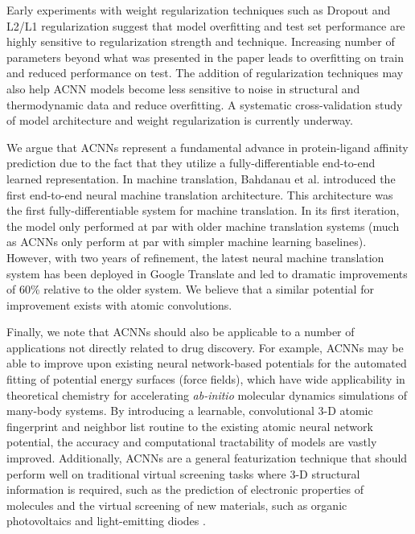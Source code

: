 Early experiments with weight regularization techniques such as Dropout and L2/L1 regularization suggest that model overfitting and test set performance are highly sensitive to regularization strength and technique.  Increasing number of parameters beyond what was presented in the paper leads to overfitting on train and reduced performance on test.  The addition of regularization techniques may also help ACNN models become less sensitive to noise in structural and thermodynamic data and reduce overfitting.  A systematic cross-validation study of model architecture and weight regularization is currently underway.

We argue that ACNNs represent a fundamental advance in protein-ligand affinity prediction due to the fact that they utilize a fully-differentiable end-to-end learned representation. In machine translation, Bahdanau et al.\cite{bahdanau2014neural} introduced the first end-to-end neural machine translation architecture. This architecture was the first fully-differentiable system for machine translation. In its first iteration, the model only performed at par with older machine translation systems (much as ACNNs only perform at par with simpler machine learning baselines). However, with two years of refinement, the latest neural machine translation system has been deployed in Google Translate\cite{wu2016google} and led to dramatic improvements of 60\% relative to the older system. We believe that a similar potential for improvement exists with atomic convolutions.

Finally, we note that ACNNs should also be applicable to a number of applications not directly related to drug discovery. For example, ACNNs may be able to improve upon existing neural network-based potentials for the automated fitting of potential energy surfaces (force fields), which have wide applicability in theoretical chemistry for accelerating \textit{ab-initio} molecular dynamics simulations of many-body systems.  By introducing a learnable, convolutional 3-D atomic fingerprint and neighbor list routine to the existing atomic neural network potential, the accuracy and computational tractability of models are vastly improved. Additionally, ACNNs are a general featurization technique that should perform well on traditional virtual screening tasks where 3-D structural information is required, such as the prediction of electronic properties of molecules \cite{montavon2013machine} and the virtual screening of new materials, such as organic photovoltaics \cite{hachmann2011harvard} and light-emitting diodes \cite{gomez2016design}.



